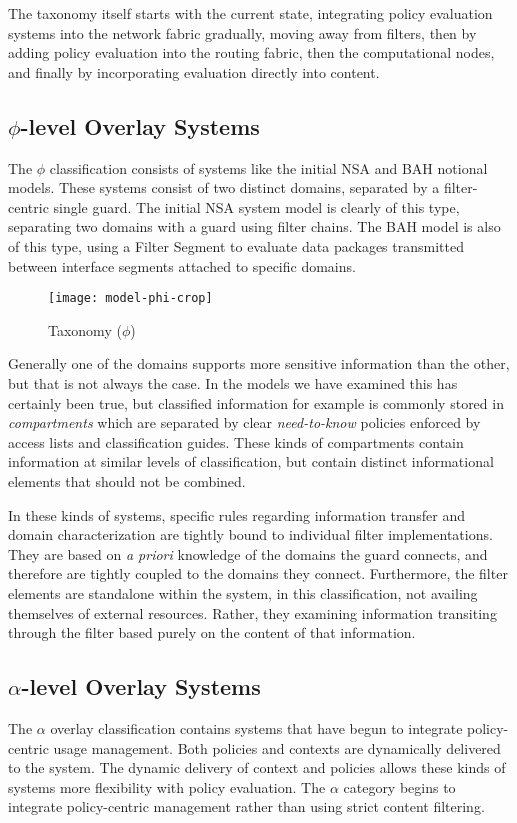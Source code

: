 The taxonomy itself starts with the current state, integrating policy evaluation systems into the network fabric gradually, moving away from filters, then by adding policy evaluation into the routing fabric, then the computational nodes, and finally by incorporating evaluation directly into content.

\subsection{$\phi$-level Overlay Systems}
The $\phi$ classification consists of systems like the initial NSA and BAH notional models.  These systems consist of two distinct domains, separated by a filter-centric single guard.  The initial NSA system model is clearly of this type, separating two domains with a guard using filter chains.  The BAH model is also of this type, using a Filter Segment to evaluate data packages transmitted between interface segments attached to specific domains.

\begin{figure}[!t]
\centering
\texttt{[image: model-phi-crop]}
\caption{Taxonomy ($\phi$)}
\label{fig:model:taxonomy-phi}
\end{figure}

Generally one of the domains supports more sensitive information than the other, but that is not always the case.  In the models we have examined this has certainly been true, but classified information for example  is commonly stored in \textit{compartments} which are separated by clear \textit{need-to-know} policies enforced by access lists and classification guides.  These kinds of compartments contain information at similar levels of classification, but contain distinct informational elements that should not be combined.

In these kinds of systems, specific rules regarding information transfer and domain characterization are tightly bound to individual filter implementations.  They are based on \textit{a priori} knowledge of the domains the guard connects, and therefore are tightly coupled to the domains they connect.  Furthermore, the filter elements are standalone within the system, in this classification, not availing themselves of external resources.  Rather, they examining information transiting through the filter based purely on the content of that information.

\subsection{$\alpha$-level Overlay Systems}
The $\alpha$ overlay classification contains systems that have begun to integrate policy-centric usage management. Both policies and contexts are dynamically delivered to the system. The dynamic delivery of context and policies allows these kinds of systems more flexibility with policy evaluation. The $\alpha$ category begins to integrate policy-centric management rather than using strict content filtering.

